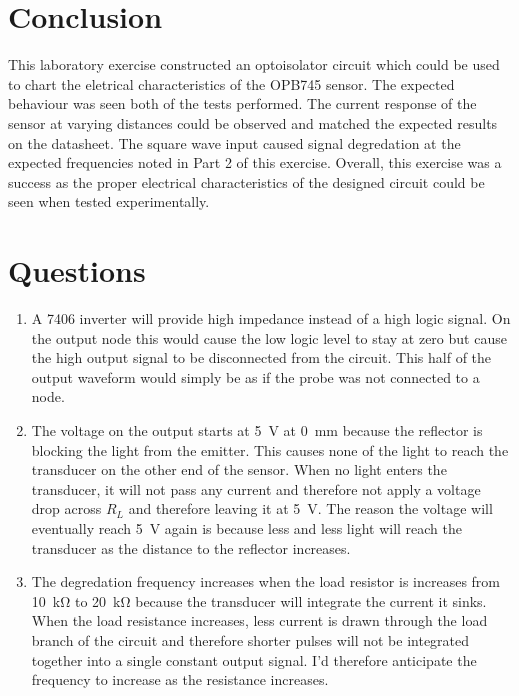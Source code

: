 \documentclass[CMPE]{../KGCOEReport}
\begin{document}
    \section*{Conclusion}
    This laboratory exercise constructed an optoisolator circuit which could be used
    to chart the eletrical characteristics of the OPB745 sensor. The expected behaviour
    was seen both of the tests performed. The current response of the sensor at varying
    distances could be observed and matched the expected results on the datasheet.
    The square wave input caused signal degredation at the expected frequencies noted
    in Part 2 of this exercise. Overall, this exercise was a success as the proper
    electrical characteristics of the designed circuit could be seen when tested
    experimentally.

	\section*{Questions}

	\begin{enumerate}
	\item
	A 7406 inverter will provide high impedance instead of a high logic signal. On
	the output node this would cause the low logic level to stay at zero but cause
	the high output signal to be disconnected from the circuit. This half of the
	output waveform would simply be as if the probe was not connected to a node.
	\item
	The voltage on the output starts at \SI{5}{\volt} at \SI{0}{\milli\metre} because the
	reflector is blocking the light from the emitter. This causes none of the light to
	reach the transducer on the other end of the sensor. When no light enters the
	transducer, it will not pass any current and therefore not apply a voltage drop
	across $R_L$ and therefore leaving it at \SI{5}{\volt}. The reason the voltage will
	eventually reach \SI{5}{\volt} again is because less and less light will reach the
	transducer as the distance to the reflector increases.  
	\item
	The degredation frequency increases when the load resistor is increases from
	\SI{10}{\kilo\ohm} to \SI{20}{\kilo\ohm} because the transducer will integrate
	the current it sinks. When the load resistance increases, less current is drawn
	through the load branch of the circuit and therefore shorter pulses will not
	be integrated together into a single constant output signal. I'd therefore
	anticipate the frequency to increase as the resistance increases. 
	\end{enumerate}
	

\end{document}
